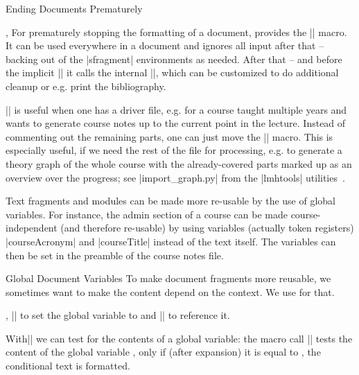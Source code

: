 \begin{sfragment}{Ending Documents Prematurely}
\begin{function}{\prematurestop,\afterprematurestop}
  For prematurely stopping the formatting of a document, \sTeX provides the
  |\prematurestop| macro. It can be used everywhere in a document and ignores all input
  after that -- backing out of the |sfragment| environments as needed. After that -- and
  before the implicit || it calls the internal |\afterprematurestop|, which
  can be customized to do additional cleanup or e.g. print the bibliography.

  |\prematurestop| is useful when one has a driver file, e.g. for a course taught multiple
  years and wants to generate course notes up to the current point in the lecture. Instead
  of commenting out the remaining parts, one can just move the |\prematurestop| macro.
  This is especially useful, if we need the rest of the file for processing, e.g. to
  generate a theory graph of the whole course with the already-covered parts marked up as
  an overview over the progress; see |import_graph.py| from the |lmhtools|
  utilities~\cite{lmhtools:github:on}.
\end{function}

Text fragments and modules can be made more re-usable by the use of global variables. For
instance, the admin section of a course can be made course-independent (and therefore
re-usable) by using variables (actually token registers) |courseAcronym| and |courseTitle|
instead of the text itself. The variables can then be set in the \sTeX preamble of the
course notes file.
\end{sfragment}

\begin{sfragment}{Global Document Variables}
  To make document fragments more reusable, we sometimes want to make the content depend
  on the context. We use  for that.

\begin{function}{\setSGvar,\useSGvar}
  || to set the global variable  to
   and || to reference it.
\end{function}
  
\begin{function}{\ifSGvar}
  With|\ifSGvar| we can test for the contents of a global variable: the macro call
  || tests the content of the global
  variable , only if (after expansion) it is equal to , the
  conditional text  is formatted.
\end{function}
\end{sfragment}


